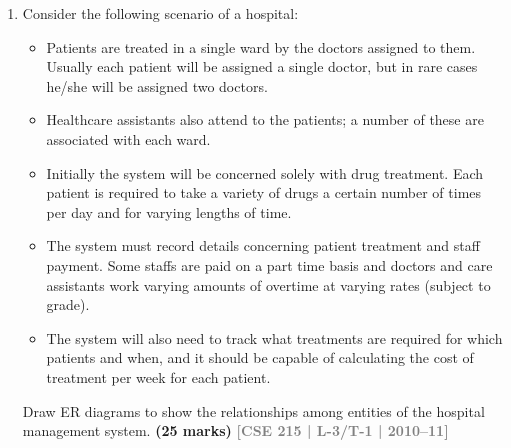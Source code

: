 \documentclass[12pt,a3paper]{article}
\newcommand{\yr}[1]{\hfill\textcolor{gray}{\small\textbf{[#1]}}}
\newcommand{\mk}[1]{\textcolor{orange!70!black}{\small\textbf{(#1 marks)}}}
\begin{document}
\begin{enumerate}
\begin{tcolorbox}[enhanced,breakable,ansbox,colback=cA!4,colframe=cA,boxrule=0.8pt,arc=5pt,title={\textbf{Answer}},fonttitle=\bfseries\color{white},colbacktitle=cA]
\vspace{1em}
\textbf{Schema Properties:}
\begin{itemize}[leftmargin=2em, itemsep=0.3em]
    \item \textbf{EMPLOYEE:} Contains only non-multivalued attributes belonging directly to the employee.
    \item \textbf{JOB\_HISTORY:} The composite primary key \texttt{(\underline{SSN}, \underline{Date\_Promoted})} ensures that a single employee can have multiple unique job histories recorded over time without collision.
    \item \textbf{CERTIFICATION:} The composite primary key \texttt{(\underline{SSN}, \underline{Cert\_Type}, \underline{Date\_Achieved})} allows an employee to hold multiple certifications, as well as repeatedly earn the same certification on different dates.
\end{itemize}

\end{tcolorbox}

\item Consider the following scenario of a hospital:

\begin{itemize}[leftmargin=1.5em,itemsep=2pt]
  \item Patients are treated in a single ward by the doctors assigned to them. Usually each patient will be assigned a single doctor, but in rare cases he/she will be assigned two doctors.
  \item Healthcare assistants also attend to the patients; a number of these are associated with each ward.
  \item Initially the system will be concerned solely with drug treatment. Each patient is required to take a variety of drugs a certain number of times per day and for varying lengths of time.
  \item The system must record details concerning patient treatment and staff payment. Some staffs are paid on a part time basis and doctors and care assistants work varying amounts of overtime at varying rates (subject to grade).
  \item The system will also need to track what treatments are required for which patients and when, and it should be capable of calculating the cost of treatment per week for each patient.
\end{itemize}

Draw ER diagrams to show the relationships among entities of the hospital management system.
\mk{25} \yr{CSE 215 | L-3/T-1 | 2010--11}


\end{enumerate}
\end{document}
